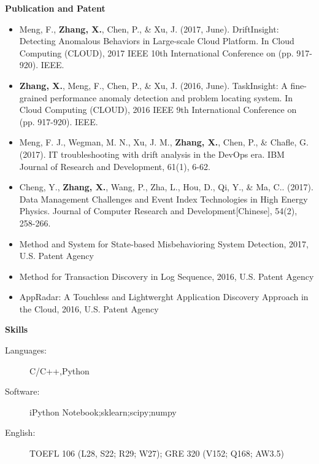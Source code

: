 \documentclass[letterpaper,11pt]{article}
\newcommand{\resheading}[1]{{\large \colorbox{mygrey}{\begin{minipage}{\textwidth}{\textbf{#1 \vphantom{p\^{E}}}}\end{minipage}}}}
\begin{document}
	



\resheading{Publication and Patent}
	\begin{itemize}
		\item
			Meng, F., \textbf{Zhang, X.}, Chen, P., \& Xu, J. (2017, June). DriftInsight: Detecting Anomalous Behaviors in Large-scale Cloud Platform. In Cloud Computing (CLOUD), 2017 IEEE 10th International Conference on (pp. 917-920). IEEE.
		\item
			\textbf{Zhang, X.}, Meng, F., Chen, P., \& Xu, J. (2016, June). TaskInsight: A fine-grained performance anomaly detection and problem locating system. In Cloud Computing (CLOUD), 2016 IEEE 9th International Conference on (pp. 917-920). IEEE.
		\item
			Meng, F. J., Wegman, M. N., Xu, J. M., \textbf{Zhang, X.}, Chen, P., \& Chafle, G. (2017). IT troubleshooting with drift analysis in the DevOps era. IBM Journal of Research and Development, 61(1), 6-62.
		\item
			Cheng, Y., \textbf{Zhang, X.}, Wang, P., Zha, L., Hou, D., Qi, Y., \& Ma, C.. (2017). Data Management Challenges and Event Index Technologies in High Energy Physics. Journal of Computer Research and Development[Chinese], 54(2), 258-266.
		\item
			Method and System for State-based Misbehavioring System Detection, 2017, U.S. Patent Agency
		\item
			Method for Transaction Discovery in Log Sequence, 2016, U.S. Patent Agency
		\item
			AppRadar: A Touchless and Lightwerght Application Discovery Approach in the Cloud, 2016, U.S. Patent Agency
		\end{itemize}

\resheading{Skills}
	\begin{description}
		\item[Languages:] { \footnotesize C/C++,Python}
		\item[Software:]{\footnotesize {iPython Notebook};{sklearn};{scipy};{numpy}}  
		\item[English:]{ TOEFL 106 (L28, S22; R29; W27); GRE 320 (V152; Q168; AW3.5)}
	\end{description} %
\end{document}
